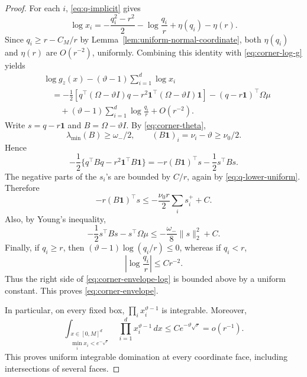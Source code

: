 \begin{proof}
For each \(i\), \eqref{eq:q-implicit} gives
\[
 \log x_i
 =
 -\frac{q_i^2-r^2}{2}
 -\log\frac{q_i}{r}
 +\eta(q_i)-\eta(r).
\]
Since \(q_i\ge r-C_M/r\) by
Lemma~\ref{lem:uniform-normal-coordinate}, both
\(\eta(q_i)\) and \(\eta(r)\) are \(O(r^{-2})\), uniformly.
Combining this identity with \eqref{eq:corner-log-g} yields
\begin{align}
 &\log g_z(x)
 -(\vartheta-1)\sum_{i=1}^d\log x_i
 \nonumber\\
 &\quad=
 -\frac12\left[
 q^\top(\Omega-\vartheta I)q
 -r^2\mathbf 1^\top(\Omega-\vartheta I)\mathbf 1
 \right]
 -(q-r\mathbf 1)^\top\Omega\mu
 \nonumber\\
 &\qquad
 +(\vartheta-1)\sum_{i=1}^d\log\frac{q_i}{r}
 +O(r^{-2}).
 \label{eq:corner-envelope-log}
\end{align}
Write \(s=q-r\mathbf 1\) and \(B=\Omega-\vartheta I\).
By \eqref{eq:corner-theta},
\[
 \lambda_{\min}(B)\ge\omega_-/2,
 \qquad
 (B\mathbf 1)_i=\nu_i-\vartheta\ge\nu_0/2.
\]
Hence
\[
 -\frac12\{q^\top Bq-r^2\mathbf 1^\top B\mathbf 1\}
 =
 -r(B\mathbf 1)^\top s-\frac12s^\top Bs.
\]
The negative parts of the \(s_i\)'s are bounded by \(C/r\),
again by \eqref{eq:q-lower-uniform}. Therefore
\[
 -r(B\mathbf 1)^\top s
 \le
 -\frac{\nu_0r}{2}\sum_i s_i^+ +C.
\]
Also, by Young's inequality,
\[
 -\frac12s^\top Bs-s^\top\Omega\mu
 \le
 -\frac{\omega_-}{8}\|s\|_2^2+C.
\]
Finally, if \(q_i\ge r\), then
\((\vartheta-1)\log(q_i/r)\le0\), whereas if \(q_i<r\),
\[
 \left|\log\frac{q_i}{r}\right|\le Cr^{-2}.
\]
Thus the right side of \eqref{eq:corner-envelope-log} is bounded
above by a uniform constant. This proves
\eqref{eq:corner-envelope}.

In particular, on every fixed box,
\(\prod_i x_i^{\vartheta-1}\) is integrable. Moreover,
\begin{equation}
 \int_{\substack{x\in[0,M]^d\\
                 \min_i x_i<e^{-\sqrt r}}}
 \prod_{i=1}^dx_i^{\vartheta-1}\,dx
 \le Ce^{-\vartheta\sqrt r}
 =o(r^{-1}).
 \label{eq:corner-face-small}
\end{equation}
This proves uniform integrable domination at every coordinate
face, including intersections of several faces.


\end{proof}
